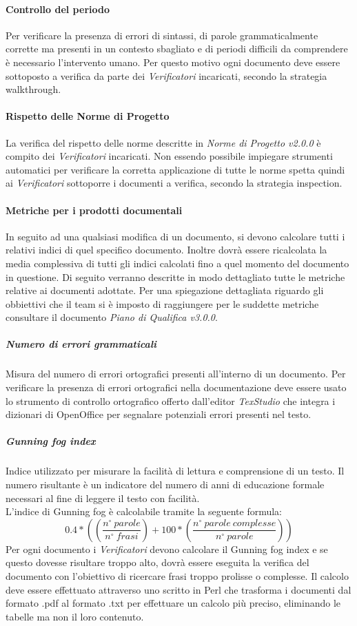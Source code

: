 \paragraph{Controllo del periodo} \Spazio
Per verificare la presenza di errori di sintassi, di parole grammaticalmente corrette ma presenti in un contesto sbagliato e di periodi difficili da comprendere è necessario l'intervento umano. Per questo motivo ogni documento deve essere sottoposto a verifica da parte dei \emph{Verificatori} incaricati, secondo la strategia walkthrough.

\paragraph{Rispetto delle Norme di Progetto} \Spazio
La verifica del rispetto delle norme descritte in \emph{Norme di Progetto v2.0.0} è compito dei \emph{Verificatori} incaricati. Non essendo possibile impiegare strumenti automatici per verificare la corretta applicazione di tutte le norme spetta quindi ai \emph{Verificatori} sottoporre i documenti a verifica, secondo la strategia inspection.

\paragraph{Metriche per i prodotti documentali} \Spazio
In seguito ad una qualsiasi modifica di un documento, si devono calcolare tutti i relativi indici di quel specifico documento. Inoltre dovrà essere ricalcolata la media complessiva di tutti gli indici calcolati fino a quel momento del documento in questione.
Di seguito verranno descritte in modo dettagliato tutte le metriche relative ai documenti adottate. Per una spiegazione dettagliata riguardo gli obbiettivi che il team si è imposto di raggiungere per le suddette metriche consultare il documento \emph{Piano di Qualifica v3.0.0}.
\subparagraph{Numero di errori grammaticali}\Spazio
Misura del numero di errori ortografici presenti all'interno di un documento.
Per verificare la presenza di errori ortografici nella documentazione deve essere usato lo strumento di controllo ortografico offerto dall'editor \emph{TexStudio} che integra i dizionari di OpenOffice per segnalare potenziali errori presenti nel testo.

\subparagraph{Gunning fog index}\Spazio
Indice utilizzato per misurare la facilità di lettura e comprensione di un testo. Il numero risultante è un indicatore del numero di anni di educazione formale necessari al fine di leggere il testo con facilità. \\
L'indice di Gunning fog è calcolabile tramite la seguente formula:
$$
0.4*((\frac{n^{\circ}\:parole}{n^{\circ}\:frasi})+100*(\frac{n^{\circ}\:parole\:complesse}{n^{\circ}\:parole}))
$$
Per ogni documento i \emph{Verificatori} devono calcolare il Gunning fog index e se questo dovesse risultare troppo alto, dovrà essere eseguita la verifica del documento con l'obiettivo di ricercare frasi troppo prolisse o complesse. Il calcolo deve essere effettuato attraverso uno  scritto in Perl che trasforma i documenti dal formato .pdf al formato .txt per effettuare un calcolo più preciso, eliminando le tabelle ma non il loro contenuto.

